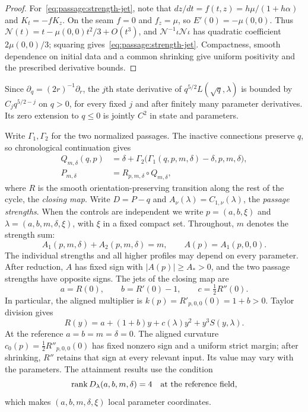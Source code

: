 \begin{proof}
For~\eqref{eq:passage:strength-jet}, note that $dz/dt=f(t,z)=h\mu/(1+h\alpha)$
and $K_t=-fK_z$. On the seam $f=0$ and $f_z=\mu$, so $E'(0)=-\mu(0,0)$.
Thus $\mathcal N(t)=t-\mu(0,0)t^2/3+O(t^3)$, and
$\mathcal N^{-1}\iota\mathcal N\iota$ has quadratic coefficient $2\mu(0,0)/3$;
squaring gives~\eqref{eq:passage:strength-jet}. Compactness, smooth dependence
on initial data and a common shrinking give uniform positivity and the
prescribed derivative bounds.
\end{proof}

Since $\partial_q=(2r)^{-1}\partial_r$, the $j$th state derivative of
$q^{5/2}L(\sqrt q,\lambda)$ is bounded by $C_jq^{5/2-j}$ on $q>0$, for every
fixed $j$ and after finitely many parameter derivatives. Its zero extension to
$q\le0$ is jointly $C^2$ in state and parameters.

Write $\Gamma_1,\Gamma_2$ for the two normalized passages.
The inactive connections preserve $q$, so chronological continuation gives
\begin{equation}\label{eq:passage:two-contact-map}
 \begin{aligned}
 Q_{m,\delta}(q,p)&=\delta+
 \Gamma_2\bigl(\Gamma_1(q,p,m,\delta)-\delta,p,m,\delta\bigr),\\
 P_{m,\delta}&=R_{p,m,\delta}\circ Q_{m,\delta},
 \end{aligned}
\end{equation}
where $R$ is the smooth orientation-preserving transition along the rest of
the cycle, the \emph{closing map}. Write $D=P-q$ and
$A_\nu(\lambda)=C_{1,\nu}(\lambda)$, the \emph{passage strengths}. When the
controls are independent we write $p=(a,b,\xi)$ and
$\lambda=(a,b,m,\delta,\xi)$, with $\xi$ in a fixed compact set. Throughout,
$m$ denotes the strength sum:
\begin{equation}\label{eq:net-strength}
 A_1(p,m,\delta)+A_2(p,m,\delta)=m,\qquad A(p)=A_1(p,0,0).
\end{equation}
The individual strengths and all higher profiles may depend on every
parameter. After reduction, $A$ has fixed sign with
$|A(p)|\ge A_*>0$, and the two passage strengths have opposite signs. The jets of the closing map are
\begin{equation}\label{eq:regular-jets}
 a=R(0),\qquad b=R'(0)-1,\qquad c=\tfrac12R''(0).
\end{equation}
In particular, the aligned multiplier is $k(p)=R'_{p,0,0}(0)=1+b>0$.
Taylor division gives
\begin{equation}\label{eq:quartic-closing-division}
 R(y)=a+(1+b)y+c(\lambda)y^2+y^3S(y,\lambda).
\end{equation}
At the reference $a=b=m=\delta=0$. The aligned curvature
$c_0(p)=\tfrac12R''_{p,0,0}(0)$ has fixed nonzero sign and a uniform
strict margin; after shrinking, $R''$ retains that sign at every relevant
input. Its value may vary with the parameters. The attainment results use
the condition
\begin{equation}\label{eq:rank}
 \operatorname{rank}D_\lambda(a,b,m,\delta)=4
 \quad\hbox{at the reference field},
\end{equation}
which makes $(a,b,m,\delta,\xi)$ local parameter coordinates.

